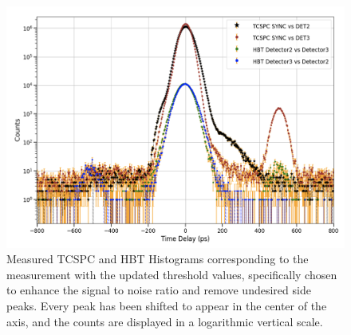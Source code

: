 \begin{figure}[hbtp]
\centering
\includegraphics[width=1\textwidth]{Refined.jpg}
\caption{Measured TCSPC and HBT Histograms corresponding to the measurement with the updated threshold values, specifically chosen to enhance the signal to noise ratio and remove undesired side peaks. Every peak has been shifted to appear in the center of the axis, and the counts are displayed in a logarithmic vertical scale. }
\label{RefinedMeasurement}
\end{figure}



